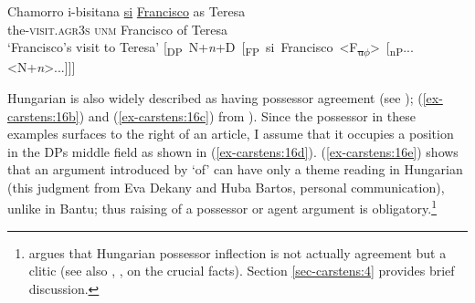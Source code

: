 \documentclass[output=paper
,modfonts
,nonflat]{langsci/langscibook}
\begin{document}
\begin{exe}
	\ex Chamorro \label{ex-carstens:15}
	\xlist
	\ex \label{ex-carstens:15a}
	\gll i-bisitana       \underline{si} \underline{Francisco}   as Teresa \\
	the-\textsc{visit.agr3s}     \textsc{unm} Francisco           of Teresa\\
	\glt `Francisco's visit to Teresa'  	
	\ex \mbox{[\textsubscript{DP} N+\textit{n}+D [\textsubscript{FP} si Francisco  <F\textsubscript{\sout{u}}\textsubscript{\sout{$\phi$}}> [\textsubscript{nP}...<N+\textit{n}>...]]]}
	\endxlist
\end{exe}
Hungarian is also widely described as having possessor agreement (see \citealt{Szabolcsi1983, Szabolcsi1994}); (\ref{ex-carstens:16b}) and (\ref{ex-carstens:16c}) from \citealt[139]{Den_Dikken1999}). Since the possessor in these examples surfaces to the right of an article, I assume that it occupies a position in the DPs middle field as shown in (\ref{ex-carstens:16d}). (\ref{ex-carstens:16e}) shows that an argument introduced by `of' can have only a theme reading in Hungarian (this judgment from Eva Dekany and Huba Bartos, personal communication), unlike in Bantu; thus raising of a possessor or agent argument is obligatory.\footnote{\label{note9} argues that Hungarian possessor inflection is not actually agreement but a clitic (see also \citealt{Den_Dikken1999}, \citealt{Bartos1999}, \citealt{Kiss2002} on the crucial facts). Section \ref{sec-carstens:4} provides brief discussion.} 
\end{document}
